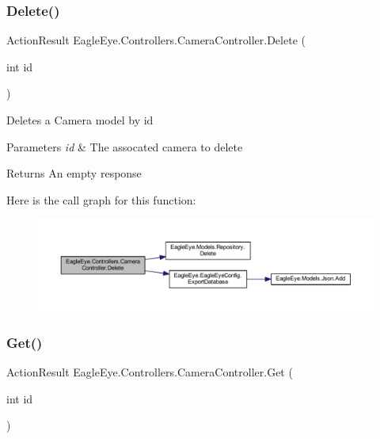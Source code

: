 \subsubsection{\texorpdfstring{Delete()}{Delete()}}
{\footnotesize\ttfamily Action\+Result Eagle\+Eye.\+Controllers.\+Camera\+Controller.\+Delete (\begin{DoxyParamCaption}\item[{int}]{id }\end{DoxyParamCaption})}



Deletes a Camera model by id 


\begin{DoxyParams}{Parameters}
{\em id} & The assocated camera to delete\\
\hline
\end{DoxyParams}
\begin{DoxyReturn}{Returns}
An empty response
\end{DoxyReturn}
Here is the call graph for this function\+:\nopagebreak
\begin{figure}[H]
\begin{center}
\leavevmode
\includegraphics[width=350pt]{class_eagle_eye_1_1_controllers_1_1_camera_controller_ade4d5c697769c79b1866f95bbf7fc889_cgraph}
\end{center}
\end{figure}
\mbox{\label{class_eagle_eye_1_1_controllers_1_1_camera_controller_a6dfc692f61939468dffcf13b5899ed5f}} 
\subsubsection{\texorpdfstring{Get()}{Get()}}
{\footnotesize\ttfamily Action\+Result Eagle\+Eye.\+Controllers.\+Camera\+Controller.\+Get (\begin{DoxyParamCaption}\item[{int}]{id }\end{DoxyParamCaption})}



